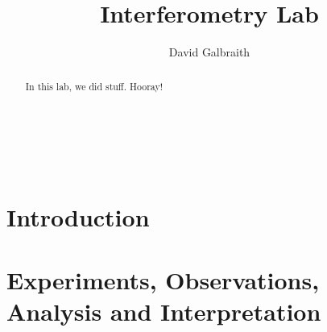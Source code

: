 \documentclass[11pt]{article}
\begin{document}
\title{Interferometry Lab}
\author{David Galbraith}
\maketitle

\normalsize
\begin{abstract} 
In this lab, we did stuff. Hooray! %
\end{abstract}


\medskip                        %

\thispagestyle{plain}

\section{Introduction}


\section{Experiments, Observations, Analysis and Interpretation} 
\end{document}
